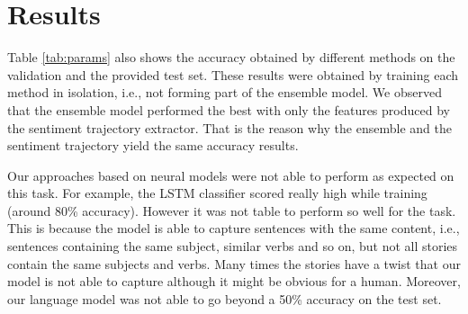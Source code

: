 \documentclass{article}
\newcommand{\lstm}{LSTM }
\begin{document}
\section{Results}
\label{sec:results}

Table \ref{tab:params} also shows the accuracy obtained by different methods on
the validation and the provided test set. These results were obtained by
training each method in isolation, i.e., not forming part of the ensemble model.
We observed that the ensemble model performed the best with only the features
produced by the sentiment trajectory extractor. That is the reason why the
ensemble and the sentiment trajectory yield the same accuracy results.



Our approaches based on neural models were not able to perform as expected on
this task. For example, the \lstm classifier scored really high while training
(around 80\% accuracy). However it was not table to perform so well for the
task. This is because the model is able to capture sentences with the same
content, i.e., sentences containing the same subject, similar verbs and so on,
but not all stories contain the same subjects and verbs. Many times the stories
have a twist that our model is not able to capture although it might be obvious
for a human. Moreover, our language model was not able to go beyond a 50\%
accuracy on the test set. 
\end{document}
